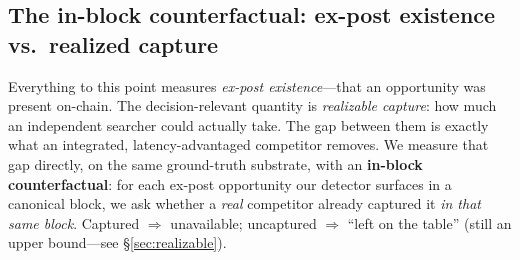 \documentclass[11pt]{article}
\begin{document}
\subsection{The in-block counterfactual: ex-post existence vs.\ realized capture}
\label{sec:counterfactual}
Everything to this point measures \emph{ex-post existence}---that an opportunity was
present on-chain. The decision-relevant quantity is \emph{realizable capture}: how
much an independent searcher could actually take. The gap between them is exactly what
an integrated, latency-advantaged competitor removes. We measure that gap directly, on
the same ground-truth substrate, with an \textbf{in-block counterfactual}: for each
ex-post opportunity our detector surfaces in a canonical block, we ask whether a
\emph{real} competitor already captured it \emph{in that same block}. Captured
$\Rightarrow$ unavailable; uncaptured $\Rightarrow$ ``left on the table'' (still an
upper bound---see \S\ref{sec:realizable}).
\end{document}
